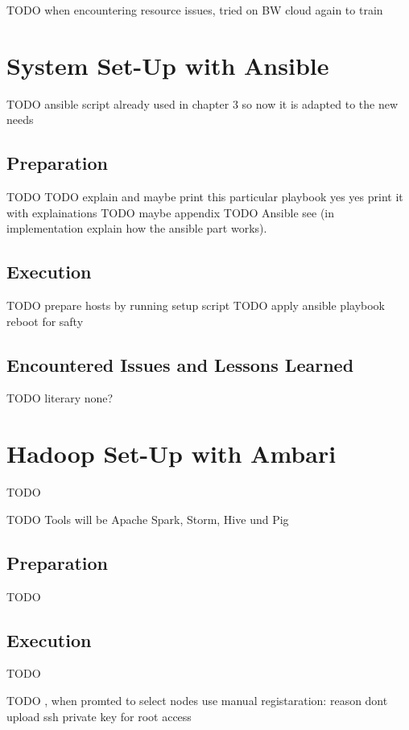 TODO when encountering resource issues, tried on BW cloud again to train


\section{System Set-Up with Ansible}

TODO ansible script already used in chapter 3 so now it is adapted to the new needs

\subsection{Preparation}

TODO
TODO explain and maybe print this particular playbook yes yes print it with explainations
TODO maybe appendix
TODO Ansible
see 
     (in implementation explain how the ansible part works). 
     


\subsection{Execution}

TODO prepare hosts by running setup script
TODO apply ansible playbook
reboot for safty

\subsection{Encountered Issues and Lessons Learned}

TODO
literary none?

\section{Hadoop Set-Up with Ambari}

TODO

TODO Tools will be Apache Spark, Storm, Hive und Pig

\subsection{Preparation}
TODO

\subsection{Execution}
TODO

TODO ,  when promted to select nodes use manual registaration: reason dont upload ssh private key for root access 

